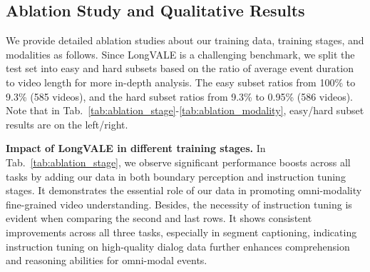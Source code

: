\begin{table}
  \centering
  \vspace{-1.5mm}
  \caption{Ablation study of models trained on LongVALE with different modalities. V: vision. A: audio. S: speech. }
  \label{tab:ablation_modality}
  \vspace{-5mm}
\end{table}

\subsection{Ablation Study and Qualitative Results}
We provide detailed ablation studies about our training data, training stages, and modalities as follows.
Since LongVALE is a challenging benchmark, we split the test set into easy and hard subsets based on the ratio of average event duration to video length for more in-depth analysis. 
The easy subset ratios from 100\% to 9.3\% (585 videos), and the hard subset ratios from 9.3\% to 0.95\% (586 videos). 
Note that in Tab.~\ref{tab:ablation_stage}-\ref{tab:ablation_modality}, easy/hard subset results are on the left/right.

\noindent\textbf{Impact of LongVALE in different training stages.}
In Tab.~\ref{tab:ablation_stage}, we observe significant performance boosts across all tasks by adding our data in both boundary perception and instruction tuning stages. 
It demonstrates the essential role of our data in promoting omni-modality fine-grained video understanding.
Besides, the necessity of instruction tuning is evident when comparing the second and last rows. 
It shows consistent improvements across all three tasks, especially in segment captioning, indicating instruction tuning on high-quality dialog data further enhances comprehension and reasoning abilities for omni-modal events.

